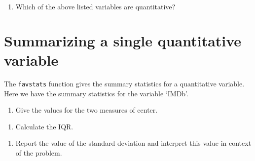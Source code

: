 \documentclass[
]{report}
\newenvironment{Shaded}{\begin{snugshade}}{\end{snugshade}}
\newcommand{\CommentTok}[1]{\textcolor[rgb]{0.56,0.35,0.01}{\textit{#1}}}
\newcommand{\KeywordTok}[1]{\textcolor[rgb]{0.13,0.29,0.53}{\textbf{#1}}}
\newcommand{\NormalTok}[1]{#1}
\newcommand{\OperatorTok}[1]{\textcolor[rgb]{0.81,0.36,0.00}{\textbf{#1}}}
\providecommand{\tightlist}{%
  \setlength{\itemsep}{0pt}\setlength{\parskip}{0pt}}
\begin{document}
\vspace{.5in}

\begin{enumerate}
\def\labelenumi{\arabic{enumi}.}
\setcounter{enumi}{2}
\tightlist
\item
  Which of the above listed variables are quantitative?
\end{enumerate}

\vspace{.5in}

\hypertarget{summarizing-a-single-quantitative-variable}{%
\section{Summarizing a single quantitative variable}\label{summarizing-a-single-quantitative-variable}}

The \texttt{favstats} function gives the summary statistics for a quantitative variable. Here we have the summary statistics for the variable `IMDb'.

\begin{Shaded}
\end{Shaded}

\begin{enumerate}
\def\labelenumi{\arabic{enumi}.}
\setcounter{enumi}{3}
\tightlist
\item
  Give the values for the two measures of center.
\end{enumerate}

\vspace{0.5in}

\begin{enumerate}
\def\labelenumi{\arabic{enumi}.}
\setcounter{enumi}{4}
\tightlist
\item
  Calculate the IQR.
\end{enumerate}

\vspace{0.5in}

\begin{enumerate}
\def\labelenumi{\arabic{enumi}.}
\setcounter{enumi}{5}
\tightlist
\item
  Report the value of the standard deviation and interpret this value in context of the problem.
  \vspace{1in}
\end{enumerate}
\end{document}
